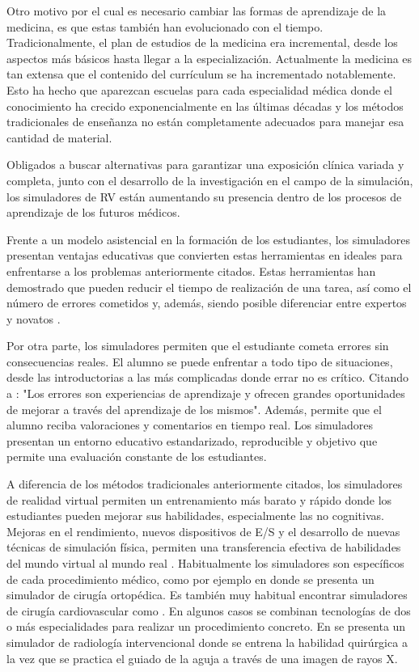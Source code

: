 Otro motivo por el cual es necesario cambiar las formas de aprendizaje de la medicina, es que estas también han evolucionado con el tiempo.
Tradicionalmente, el plan de estudios de la medicina era incremental, desde los aspectos más básicos hasta llegar a la especialización. Actualmente la medicina es tan extensa que el contenido del currículum se ha incrementado notablemente. Esto ha hecho que aparezcan escuelas para cada especialidad médica donde el conocimiento ha crecido exponencialmente en las últimas décadas y los métodos tradicionales de enseñanza no están completamente adecuados para manejar esa cantidad de material.

Obligados a buscar alternativas para garantizar una exposición clínica variada y completa, junto con el desarrollo de la investigación en el campo de la simulación, los simuladores de \ac{RV} están aumentando su presencia dentro de los procesos de aprendizaje de los futuros médicos.

Frente a un modelo asistencial en la formación de los estudiantes, los simuladores presentan  ventajas educativas que convierten estas herramientas en ideales para enfrentarse a los problemas anteriormente citados. Estas herramientas han demostrado que pueden reducir el tiempo de realización de una tarea, así como el número de errores cometidos y, además, siendo posible diferenciar entre expertos y novatos \cite{Gurusamy08}.

Por otra parte, los simuladores permiten que el estudiante cometa errores sin consecuencias reales. %
El alumno se puede enfrentar a todo tipo de situaciones, desde las introductorias a las más complicadas donde errar no es crítico. Citando a \cite{ziv2008educacion}: "Los errores son experiencias de aprendizaje y ofrecen grandes oportunidades de mejorar a través del aprendizaje de los mismos". Además, permite que el alumno reciba valoraciones y comentarios en tiempo real. Los simuladores presentan un entorno educativo estandarizado, reproducible y objetivo que permite una evaluación constante de los estudiantes.

A diferencia de los métodos tradicionales anteriormente citados, los simuladores de realidad virtual permiten un entrenamiento más barato y rápido donde los estudiantes pueden mejorar sus habilidades, especialmente las no cognitivas. Mejoras en el rendimiento, nuevos dispositivos de \ac{E/S} y el desarrollo de nuevas técnicas de simulación física, permiten una transferencia efectiva de habilidades del mundo virtual al mundo real \cite{dawereview}.
Habitualmente los simuladores son específicos de cada procedimiento médico, como por ejemplo en \cite{cecil2017advanced} donde se presenta un simulador de cirugía ortopédica. Es también muy habitual encontrar simuladores de cirugía cardiovascular como \cite{korzeniowski2018vcsim3}. En algunos casos se combinan tecnologías de dos o más especialidades para realizar un procedimiento concreto. En  \cite{villard2014interventional} se presenta un simulador de radiología intervencional donde se entrena la habilidad quirúrgica a la vez que se practica el guiado de la aguja a través de una imagen de rayos X.

